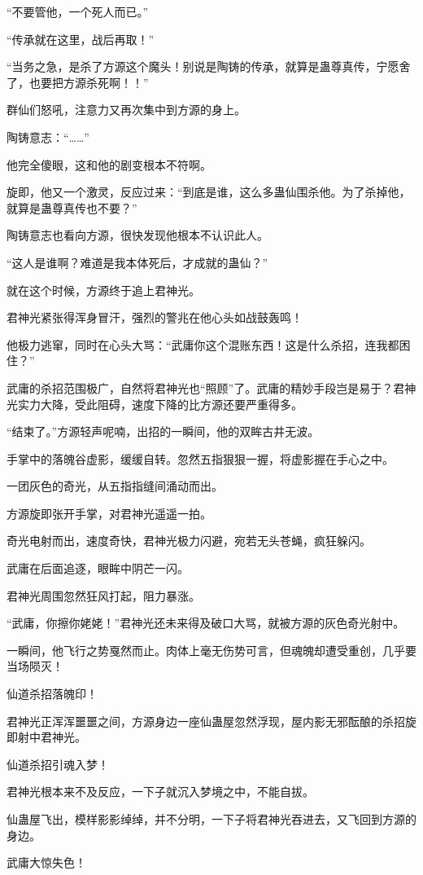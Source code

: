 \begin{this_body}
“不要管他，一个死人而已。”

“传承就在这里，战后再取！”

“当务之急，是杀了方源这个魔头！别说是陶铸的传承，就算是蛊尊真传，宁愿舍了，也要把方源杀死啊！！”

群仙们怒吼，注意力又再次集中到方源的身上。

陶铸意志：“……”

他完全傻眼，这和他的剧变根本不符啊。

旋即，他又一个激灵，反应过来：“到底是谁，这么多蛊仙围杀他。为了杀掉他，就算是蛊尊真传也不要？”

陶铸意志也看向方源，很快发现他根本不认识此人。

“这人是谁啊？难道是我本体死后，才成就的蛊仙？”

就在这个时候，方源终于追上君神光。

君神光紧张得浑身冒汗，强烈的警兆在他心头如战鼓轰鸣！

他极力逃窜，同时在心头大骂：“武庸你这个混账东西！这是什么杀招，连我都困住？”

武庸的杀招范围极广，自然将君神光也“照顾”了。武庸的精妙手段岂是易于？君神光实力大降，受此阻碍，速度下降的比方源还要严重得多。

“结束了。”方源轻声呢喃，出招的一瞬间，他的双眸古井无波。

手掌中的落魄谷虚影，缓缓自转。忽然五指狠狠一握，将虚影握在手心之中。

一团灰色的奇光，从五指指缝间涌动而出。

方源旋即张开手掌，对君神光遥遥一拍。

奇光电射而出，速度奇快，君神光极力闪避，宛若无头苍蝇，疯狂躲闪。

武庸在后面追逐，眼眸中阴芒一闪。

君神光周围忽然狂风打起，阻力暴涨。

“武庸，你擦你姥姥！”君神光还未来得及破口大骂，就被方源的灰色奇光射中。

一瞬间，他飞行之势戛然而止。肉体上毫无伤势可言，但魂魄却遭受重创，几乎要当场陨灭！

仙道杀招落魄印！

君神光正浑浑噩噩之间，方源身边一座仙蛊屋忽然浮现，屋内影无邪酝酿的杀招旋即射中君神光。

仙道杀招引魂入梦！

君神光根本来不及反应，一下子就沉入梦境之中，不能自拔。

仙蛊屋飞出，模样影影绰绰，并不分明，一下子将君神光吞进去，又飞回到方源的身边。

武庸大惊失色！


\end{this_body}

